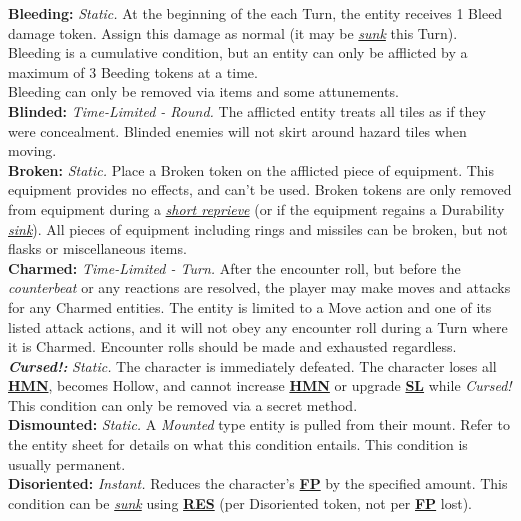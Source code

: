 \documentclass[12pt]{article}
\newcommand{\refto}[1]{\hyperlink{#1}{\textbf{#1}}}
\newcommand{\reftoit}[1]{\hyperlink{#1}{\emph{#1}}}
\begin{document}
\begin{multicols*}{2}
\textbf{Bleeding:} \emph{Static.} At the beginning of the each Turn, the entity receives 1 Bleed damage token. Assign this damage as normal (it may be \reftoit{sunk} this Turn).\\
Bleeding is a cumulative condition, but an entity can only be afflicted by a maximum of 3 Beeding tokens at a time.\\
Bleeding can only be removed via items and some attunements.\\

\textbf{Blinded:} \emph{Time-Limited - Round.} The afflicted entity treats all tiles as if they were concealment. Blinded enemies will not skirt around hazard tiles when moving.\\

\textbf{Broken:} \emph{Static.} Place a Broken token on the afflicted piece of equipment. This equipment provides no effects, and can’t be used. Broken tokens are only removed from equipment during a \reftoit{short reprieve} (or if the equipment regains a Durability \reftoit{sink}). All pieces of equipment including rings and missiles can be broken, but not flasks or miscellaneous items.\\

\textbf{Charmed:} \emph{Time-Limited - Turn.} After the encounter roll, but before the \emph{counterbeat} or any reactions are resolved, the player may make moves and attacks for any Charmed entities. The entity is limited to a Move action and one of its listed attack actions, and it will not obey any encounter roll during a Turn where it is Charmed. Encounter rolls should be made and exhausted regardless.\\

\textbf{\emph{Cursed!:}} \emph{Static.} The character is immediately defeated. The character loses all \refto{HMN}, becomes Hollow, and cannot increase \refto{HMN} or upgrade \refto{SL} while \emph{Cursed!} This condition can only be removed via a secret method.\\

\textbf{Dismounted:} \emph{Static.} A \emph{Mounted} type entity is pulled from their mount. Refer to the entity sheet for details on what this condition entails. This condition is usually permanent.\\

\textbf{Disoriented:} \emph{Instant.} Reduces the character’s \refto{FP} by the specified amount. This condition can be \reftoit{sunk} using \refto{RES} (per Disoriented token, not per \refto{FP} lost).\\


\end{multicols*}
\end{document}
